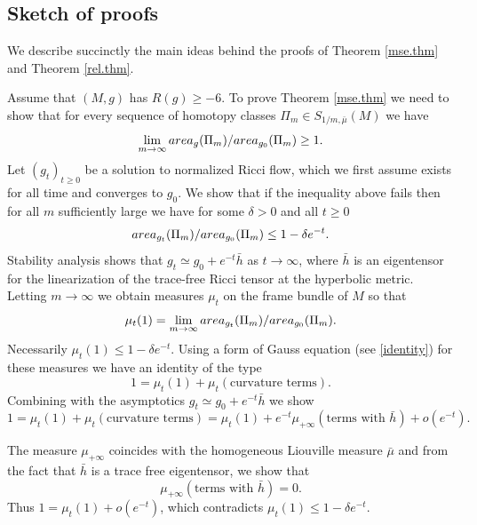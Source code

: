 \documentclass[11pt]{amsart}
\def\R{\mathbb R}
\def\N{\mathbb N}
\newtheorem{cor}[thm]{Corollary}
\theoremstyle{remark}
\theoremstyle{definition}
\begin{document}
{	%
	
	\subsection{Sketch of proofs} We describe succinctly the main ideas behind the proofs of Theorem \ref{mse.thm} and Theorem \ref{rel.thm}. 
	
	Assume that $(M,g)$ has $R(g)\geq -6$.  To prove Theorem \ref{mse.thm} we need to show that for every sequence of homotopy classes $\Pi_m\in S_{1/m,\bar \mu}(M)$ we have
	$$\lim_{m\to\infty}{{\rm area}_g(\Pi_m)}/{{\rm area}_{g_0}(\Pi_m)}\geq 1.$$
	Let $(g_t)_{t\geq 0}$ be a solution to normalized Ricci flow, which we first assume exists for all time and converges to $g_0$.  We show that if the inequality above fails then for all $m$ sufficiently large we have  for some $\delta>0$ and all $t\geq 0$
	$$ {{\rm area}_{g_t}(\Pi_m)}/{{\rm area}_{g_0}(\Pi_m)}\leq 1-\delta e^{-t}.$$
	Stability analysis shows that $g_t\simeq g_0+e^{-t}\bar h$ as $t\to\infty$, where $\bar h$ is an eigentensor {for the linearization of the trace-free Ricci tensor at the hyperbolic metric}. Letting $m\to\infty$ we obtain %
	{measures} $\mu_t$ on the frame bundle of $M$ so that $$\mu_t(1)=\lim_{m\to\infty } {{\rm area}_{g_t}(\Pi_m)}/{{\rm area}_{g_0}(\Pi_m)}.$$ Necessarily $\mu_t(1)\leq 1-\delta e^{-t}$. Using a form of Gauss equation (see \eqref{identity})  for these measures {we have an identity of the type
		$$1=\mu_t(1)+\mu_t(\mbox{curvature terms}).$$
		Combining with the  asymptotics $g_t\simeq g_0+e^{-t}\bar h$} we show
	$$1=\mu_t(1)+\mu_t(\mbox{curvature terms})=\mu_t(1)+e^{-t}\mu_{+\infty}(\mbox{terms with }\bar h)+o(e^{-t}).$$
	{The measure $\mu_{+\infty}$ {coincides with the homogeneous Liouville measure $\bar \mu$ and from the fact that $\bar h$ is a trace free eigentensor,}  we show that  $$\mu_{+\infty}(\mbox{terms with }\bar h)=0.$$ Thus $1= \mu_t(1)+o(e^{-t})$, which contradicts $\mu_t(1)\leq 1-\delta e^{-t}$.
	
}}
\end{document}
